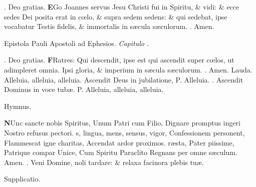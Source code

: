 \documentclass[letter,11pt]{book}
\makeatletter
\DeclareRobustCommand{\Vbar}{\vers@resp{-0.1em}{V}}
\DeclareRobustCommand{\Rbar}{\vers@resp{0pt}{R}}
\newcommand{\vers@resp@sym}{\raisebox{0.2ex}{\rotatebox[origin=c]{-20}{$\m@th\rceil$}}}
\newcommand{\vers@resp}[2]{%
  {\ooalign{\hidewidth\kern#1\vers@resp@sym\hidewidth\cr#2\cr}}%
}%
\def\P{\color{Red} P. \color{black}}
\def\V{\color{Red} \Vbar . \color{black}}
\def\R{\color{Red} \Rbar . \color{black}}
\makeatother
\begin{document}
\begin{multicols*}{2}
\par \noindent \R Deo gratias.
\lettrine[lines=2]{\bfseries \color{Red} E}{}Go Joannes servus Jesu Christi fui in Spiritu, \& vidi: \& ecce sedes Dei posita erat in c\oe lo, \& supra sedem sedens: \& qui sedebat, ipse vocabatur Testis fidelis, \& immortalis in s\ae cula s\ae culorum. \R Amen.
\vspace{-.5em} \begin{center} {\color{Red} E}pistola Pauli Apostoli ad Ephesios. \itshape Capitulo . \end{center} \vspace{-.5em}
\par \noindent \R Deo gratias.
\lettrine[lines=2]{\bfseries \color{Red} F}{}Ratres: Qui descendit, ipse est qui ascendit super c\oe los, ut adimpleret omnia. Ipsi gloria, \& imperium in s\ae cula s\ae culorum. \R Amen.
\newline \color{Red} Lauda. \color{black} Alleluia, alleluia, alleluia. Ascendit Deus in jubilatione, \P Alleluia. \V Ascendit Dominus in voce tub\ae . \P Alleluia, alleluia, alleluia.
\vspace{-.5em} \begin{center} \color{Red} Hymnus. \end{center} \vspace{-.5em}
\lettrine[lines=2]{\bfseries \color{Red} N}{}Unc sancte nobis Spiritus,
\newline Unum Patri cum Filio,
\newline \indent Dignare promptus ingeri
\newline \indent Nostro refusus pectori.
s, lingua, mens, sensus, vigor,
\newline \indent Confessionem personent,
\newline \indent Flammescat igne charitas,
\newline \indent Accendat ardor proximos.
r\ae sta, Pater piissime,
\newline \indent Patrique compar Unice,
\newline \indent Cum Spiritu Paraclito
\newline \indent Regnans per omne s\ae culum. Amen.
\newline \V Veni Domine, noli tardare: \& relaxa facinora plebis tu\ae .
\vspace{-.5em} \begin{center} \color{Red} Supplicatio. \end{center} \vspace{-.5em}

\end{multicols*}
\end{document}
